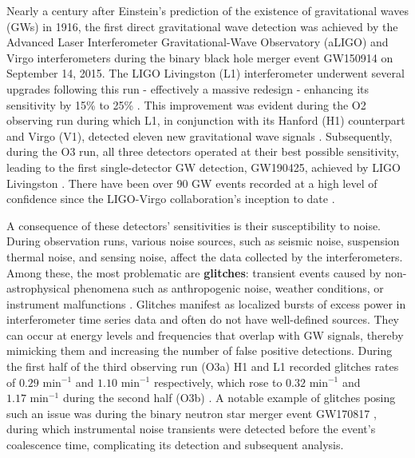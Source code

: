 \documentclass[12pt]{article}
\begin{document}
\noindent Nearly a century after Einstein's prediction of the existence of gravitational waves (GWs) in 1916, the first direct gravitational wave detection was achieved by the Advanced Laser Interferometer Gravitational-Wave Observatory (aLIGO) \cite{Abbott_LIGO_2016} and Virgo \cite{Accadia_virgo_2012} interferometers during the binary black hole merger event GW150914 on September 14, 2015. The LIGO Livingston (L1) interferometer underwent several upgrades following this run - effectively a massive redesign - enhancing its sensitivity by 15\% to 25\% \cite{grant_advanced_2016}. This improvement was evident during the O2 observing run during which L1, in conjunction with its Hanford (H1) counterpart and Virgo (V1), detected eleven new gravitational wave signals \cite{collaboration_gwtc-1_2019}. Subsequently, during the O3 run, all three detectors operated at their best possible sensitivity, leading to the first single-detector GW detection, GW190425, achieved by LIGO Livingston \cite{abbott_gwtc-2_2021}. There have been over 90 GW events recorded at a high level of confidence since the LIGO-Virgo collaboration's inception to date \cite{collaboration_gwtc-3_2023}.

\medskip
\noindent A consequence of these detectors' sensitivities is their susceptibility to noise. During observation runs, various noise sources, such as seismic noise, suspension thermal noise, and sensing noise, affect the data collected by the interferometers. Among these, the most problematic are \textbf{glitches}: transient events caused by non-astrophysical phenomena such as anthropogenic noise, weather conditions, or instrument malfunctions \cite{collaboration_guide_2020, collaboration_characterization_2016}. Glitches manifest as localized bursts of excess power in interferometer time series data and often do not have well-defined sources. They can occur at energy levels and frequencies that overlap with GW signals, thereby mimicking them and increasing the number of false positive detections. During the first half of the third observing run (O3a) H1 and L1 recorded glitches rates of $0.29\text{ min}^{-1}$ and $1.10\text{ min}^{-1}$ respectively, which rose to $0.32\text{ min}^{-1}$ and $1.17\text{ min}^{-1}$ during the second half (O3b) \cite{collaboration_gwtc-3_2023}. A notable example of glitches posing such an issue was during the binary neutron star merger event GW170817 \cite{collaboration_gw170817_2017}, during which instrumental noise transients were detected before the event's coalescence time, complicating its detection and subsequent analysis.
\end{document}
